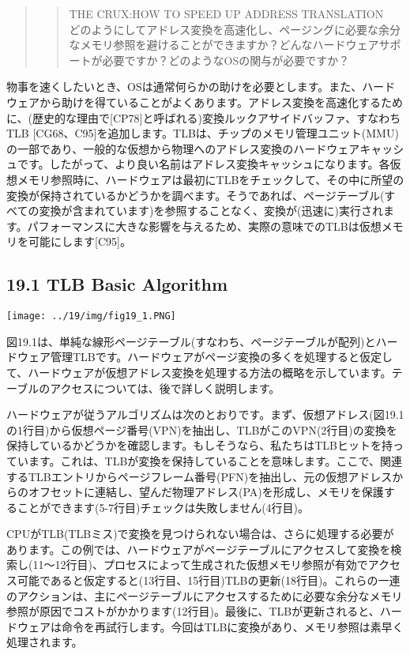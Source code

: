 \begin{quote}
\begin{quote}
THE CRUX:HOW TO SPEED UP ADDRESS TRANSLATION\\
どのようにしてアドレス変換を高速化し、ページングに必要な余分なメモリ参照を避けることができますか？どんなハードウェアサポートが必要ですか？どのようなOSの関与が必要ですか？
\end{quote}
\end{quote}

物事を速くしたいとき、OSは通常何らかの助けを必要とします。また、ハードウェアから助けを得ていることがよくあります。アドレス変換を高速化するために、(歴史的な理由で{[}CP78{]}と呼ばれる)変換ルックアサイドバッファ、すなわちTLB
{[}CG68、C95{]}を追加します。TLBは、チップのメモリ管理ユニット(MMU)の一部であり、一般的な仮想から物理へのアドレス変換のハードウェアキャッシュです。したがって、より良い名前はアドレス変換キャッシュになります。各仮想メモリ参照時に、ハードウェアは最初にTLBをチェックして、その中に所望の変換が保持されているかどうかを調べます。そうであれば、ページテーブル(すべての変換が含まれています)を参照することなく、変換が(迅速に)実行されます。パフォーマンスに大きな影響を与えるため、実際の意味でのTLBは仮想メモリを可能にします{[}C95{]}。

\hypertarget{tlb-basic-algorithm}{%
\subsection*{19.1 TLB Basic Algorithm}\label{tlb-basic-algorithm}}

\texttt{[image: ../19/img/fig19\_1.PNG]}

図19.1は、単純な線形ページテーブル(すなわち、ページテーブルが配列)とハードウェア管理TLBです。ハードウェアがページ変換の多くを処理すると仮定して、ハードウェアが仮想アドレス変換を処理する方法の概略を示しています。テーブルのアクセスについては、後で詳しく説明します。

ハードウェアが従うアルゴリズムは次のとおりです。まず、仮想アドレス(図19.1の1行目)から仮想ページ番号(VPN)を抽出し、TLBがこのVPN(2行目)の変換を保持しているかどうかを確認します。もしそうなら、私たちはTLBヒットを持っています。これは、TLBが変換を保持していることを意味します。ここで、関連するTLBエントリからページフレーム番号(PFN)を抽出し、元の仮想アドレスからのオフセットに連結し、望んだ物理アドレス(PA)を形成し、メモリを保護することができます(5-7行目)チェックは失敗しません(4行目)。

CPUがTLB(TLBミス)で変換を見つけられない場合は、さらに処理する必要があります。この例では、ハードウェアがページテーブルにアクセスして変換を検索し(11〜12行目)、プロセスによって生成された仮想メモリ参照が有効でアクセス可能であると仮定すると(13行目、15行目)TLBの更新(18行目)。これらの一連のアクションは、主にページテーブルにアクセスするために必要な余分なメモリ参照が原因でコストがかかります(12行目)。最後に、TLBが更新されると、ハードウェアは命令を再試行します。今回はTLBに変換があり、メモリ参照は素早く処理されます。


